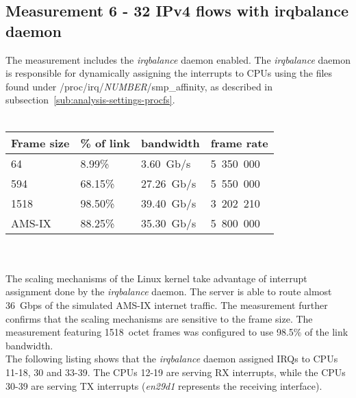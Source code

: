 
\subsection{Measurement 6 - 32 IPv4 flows with irqbalance daemon}
The measurement includes the {\it{irqbalance}} daemon enabled.
The {\it{irqbalance}} daemon is responsible for dynamically assigning the interrupts to CPUs
using the files found under /proc/irq/{\it{NUMBER}}/smp\_affinity,
as described in subsection~\ref{sub:analysis-settings-procfs}.
\\
\\
\begin{tabular}{ | l | l | l | l | }
\hline
Frame size & \% of link & bandwidth & frame rate \\
\hline
64     &  8.99\% &  3.60~Gb/s & 5~350~000 \\
594    & 68.15\% & 27.26~Gb/s & 5~550~000 \\
1518   & 98.50\% & 39.40~Gb/s & 3~202~210 \\
AMS-IX & 88.25\% & 35.30~Gb/s & 5~800~000 \\
\hline
\end{tabular}
\\
\\
The scaling mechanisms of the Linux kernel take advantage of interrupt assignment
done by the {\it{irqbalance}} daemon.
The server is able to route almost 36~Gbps of the simulated AMS-IX internet traffic.
The measurement further confirms that the scaling mechanisms are sensitive to the frame size.
The measurement featuring 1518~octet frames was configured to use 98.5\% of the link bandwidth.
\\
The following listing shows that the {\it{irqbalance}} daemon assigned IRQs to CPUs 11-18, 30 and 33-39.
The CPUs 12-19 are serving RX interrupts, while the CPUs 30-39 are serving TX interrupts
({\it{en29d1}} represents the receiving interface).

\newpage

